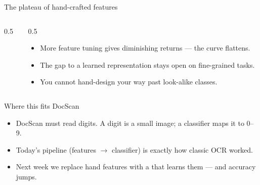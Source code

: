 \documentclass[10pt,aspectratio=169]{beamer}
\begin{document}
\begin{frame}{The plateau of hand-crafted features}
  \begin{columns}[T]
    \begin{column}{0.5\textwidth}
      \begin{center}
      \end{center}
    \end{column}
    \begin{column}{0.5\textwidth}
      \begin{itemize}
        \item More feature tuning gives diminishing returns — the curve flattens.
        \item The gap to a learned representation stays open on fine-grained tasks.
        \item You cannot hand-design your way past look-alike classes.
      \end{itemize}
    \end{column}
  \end{columns}
\end{frame}

\begin{frame}{Where this fits DocScan}
  \begin{itemize}
    \item DocScan must read digits. A digit is a small image; a classifier maps it to 0--9.
    \item Today's pipeline (features $\rightarrow$ classifier) is exactly how classic OCR worked.
    \item Next week we replace hand features with a  that learns them — and accuracy jumps.
  \end{itemize}
\end{frame}
\end{document}
